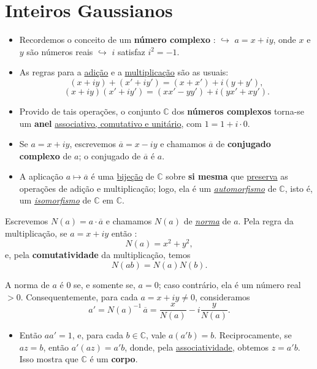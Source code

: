 \section{Inteiros Gaussianos}

    \begin{itemize}[left=0.5cm, align=left, nosep]
        \item Recordemos o conceito de um \textbf{número complexo} :
            $\hookrightarrow$ $a = x + iy$, onde $x$ e $y$ são números reais
            $\hookrightarrow$ $i$ satisfaz $i^2 = -1$. 
        \item As regras para a \underline{adição} e a \underline{multiplicação} são as usuais:
            \[
                (x + iy) + (x' + iy') = (x + x') + i(y + y'),
            \]
            \[
                (x + iy)(x' + iy') = (xx' - yy') + i(yx' + xy').
            \] 
        \item Provido de tais operações, o conjunto $\mathbb{C}$ dos \textbf{números complexos} torna-se um \textbf{anel}
        \underline{associativo, comutativo e unitário}, com $1 = 1 + i \cdot 0$.  

        \item Se $a = x + iy$, escrevemos $\boxed{\overline{a} = x - iy}$ e chamamos $\overline{a}$ de 
        \textbf{conjugado complexo} de $a$; o conjugado de $\overline{a}$ é $a$.  

        \item A aplicação $a \mapsto \overline{a}$ é uma \underline{bijeção} de $\mathbb{C}$ sobre \textbf{si mesma} que 
        \underline{preserva} as operações de adição e multiplicação; logo, ela é um \underline{\textit{automorfismo}} de 
        $\mathbb{C}$, isto é, um \underline{\textit{isomorfismo}} de $\mathbb{C}$ em $\mathbb{C}$.
    
    \end{itemize}

    Escrevemos $N(a) = a \cdot \overline{a}$ e chamamos $N(a)$ de \underline{\textit{norma}} de $a$.  
    Pela regra da multiplicação, se $a = x + iy$ então : 
    \[
    N(a) = x^2 + y^2,
    \]
    e, pela \textbf{comutatividade} da multiplicação, temos
    \[
    N(ab) = N(a)N(b).
    \]

    A norma de $a$ é $0$ se, e somente se, $a = 0$; caso contrário, ela é um número real $> 0$.  
    Consequentemente, para cada $a = x + iy \neq 0$, consideramos
    \[
    a' = N(a)^{-1}\,\overline{a} = \frac{x}{N(a)} - i\frac{y}{N(a)}.
    \]

    \begin{itemize}[left=0.5cm, align=left, nosep]
        \item Então $aa' = 1$, e, para cada $b \in \mathbb{C}$, vale $a(a'b) = b$.  
        Reciprocamente, se $az = b$, então $a'(az) = a'b$, donde, pela \underline{associatividade}, obtemos 
        $z = a'b$. Isso mostra que $\mathbb{C}$ é um \textbf{corpo}.
    \end{itemize}
    
